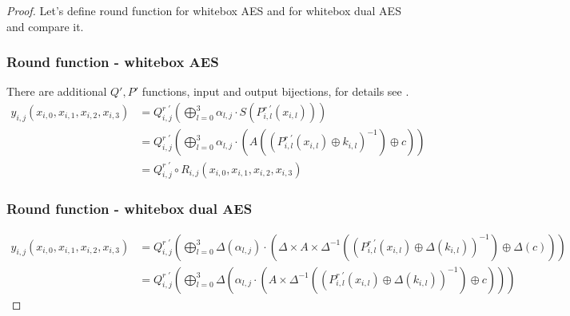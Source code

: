 \documentclass[11pt,oneside,final]{fithesis2}
\begin{document}
	\begin{proof}
	Let's define round function for whitebox AES and for whitebox dual AES and compare it.

	\subsubsection*{Round function - whitebox AES}
	There are additional $Q' ,P' $ functions, input and output bijections, for details see \citep{Chow02white-boxcryptography} \citep{Billet:2004:CWB:2080787.2080809}.
	\begin{subequations}
	\begin{align} 
	y_{i,j}\left(x_{i,0}, x_{i,1}, x_{i,2}, x_{i,3}\right) & = Q^{r \; \prime}_{i,j}\left( \bigoplus^3_{l=0} \alpha_{l,j} \cdot S \left(P^{r \; \prime}_{i,l}\left(x_{i,l}\right) \right) \right) \\
								& = Q^{r \; \prime}_{i,j}\left( \bigoplus^3_{l=0} \alpha_{l,j} \cdot \left( A \left( \left(P^{r \; \prime}_{i,l}\left(x_{i,l}\right) \oplus k_{i,l} \right)^{-1} \right) \oplus c \right) \right) \\
								& = Q^{r \; \prime}_{i,j} \circ R_{i,j}\left(x_{i,0}, x_{i,1}, x_{i,2}, x_{i,3}\right) \label{eq:whitebox_aes_roud}
	\end{align}
	\end{subequations}

	\subsubsection*{Round function - whitebox dual AES}
	\begin{subequations}
	\begin{align} \label{eq:whitebox_dual_aes_r}
	y_{i,j}\left(x_{i,0}, x_{i,1}, x_{i,2}, x_{i,3}\right) &= Q^{r \; \prime}_{i,j}\left( \bigoplus^3_{l=0} \Delta \left(\alpha_{l,j}\right) \cdot \left( \Delta \times A \times \Delta^{-1} \left( \left(P^{r \; \prime}_{i,l}\left(x_{i,l}\right) \oplus \Delta\left(k_{i,l}\right) \right)^{-1} \right) \oplus \Delta \left(c\right) \right) \right) \\
								&= Q^{r \; \prime}_{i,j}\left( \bigoplus^3_{l=0} \Delta \left(\alpha_{l,j}        \cdot \left(               A \times \Delta^{-1} \left( \left(P^{r \; \prime}_{i,l}\left(x_{i,l}\right) \oplus \Delta\left(k_{i,l}\right) \right)^{-1} \right) \oplus c \right) \right) \right)
	\end{align}
	\end{subequations}


\end{proof}
\end{document}

